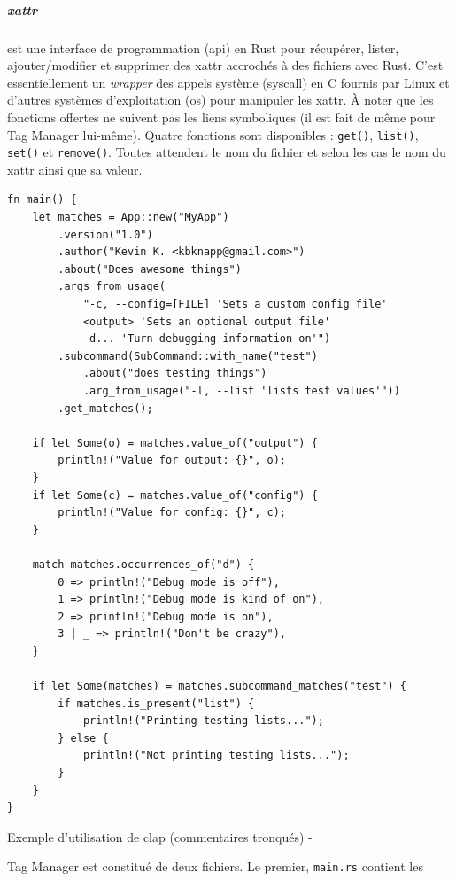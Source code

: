 \subparagraph{xattr}
est une interface de programmation (\acrshort{api}) 
en Rust pour récupérer, lister, ajouter/modifier et supprimer des \acrshort{xattr} accrochés à des 
fichiers avec Rust. C'est essentiellement un \textit{wrapper} des appels système (\acrshort{syscall}) en C fournis par Linux 
et d'autres systèmes d'exploitation (\acrshort{os}) pour manipuler les \acrshort{xattr}. À noter que les fonctions offertes ne 
suivent pas les liens symboliques (il est fait de même pour Tag Manager lui-même). Quatre fonctions 
sont disponibles : \texttt{get()}, \texttt{list()}, \texttt{set()} 
et \texttt{remove()}. Toutes attendent le nom du fichier et selon les cas le nom du 
\acrshort{xattr} ainsi que sa valeur.
\bigbreak
\begin{code}
    \begin{verbatim}
fn main() {
    let matches = App::new("MyApp")
        .version("1.0")
        .author("Kevin K. <kbknapp@gmail.com>")
        .about("Does awesome things")
        .args_from_usage(
            "-c, --config=[FILE] 'Sets a custom config file'
            <output> 'Sets an optional output file'
            -d... 'Turn debugging information on'")
        .subcommand(SubCommand::with_name("test")
            .about("does testing things")
            .arg_from_usage("-l, --list 'lists test values'"))
        .get_matches();

    if let Some(o) = matches.value_of("output") {
        println!("Value for output: {}", o);
    }
    if let Some(c) = matches.value_of("config") {
        println!("Value for config: {}", c);
    }

    match matches.occurrences_of("d") {
        0 => println!("Debug mode is off"),
        1 => println!("Debug mode is kind of on"),
        2 => println!("Debug mode is on"),
        3 | _ => println!("Don't be crazy"),
    }

    if let Some(matches) = matches.subcommand_matches("test") {
        if matches.is_present("list") {
            println!("Printing testing lists...");
        } else {
            println!("Not printing testing lists...");
        }
    }
}
    \end{verbatim}
    \caption{Exemple d'utilisation de clap (commentaires tronqués) - \cite{ref42}}
    \label{tag_manager_clap}
\end{code}
\bigbreak
Tag Manager est constitué de deux fichiers. Le premier, \texttt{main.rs} contient les 

